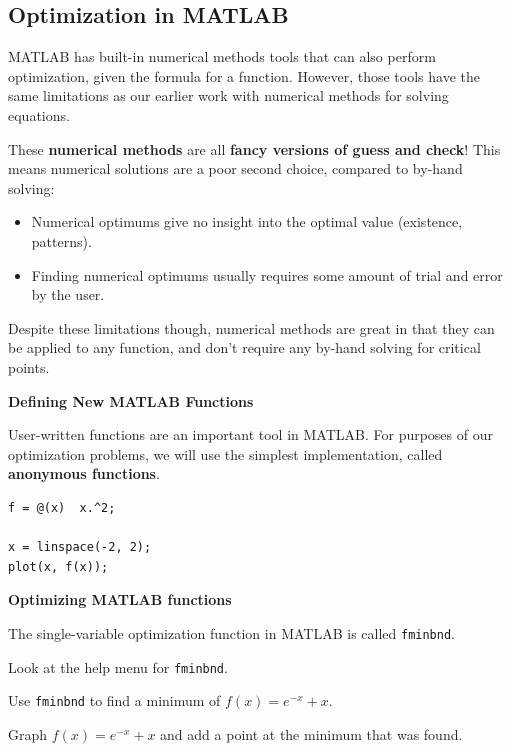 \newpage

\subsection*{Optimization in MATLAB}

MATLAB has built-in numerical methods tools that can also perform
optimization, given the formula for a function.  However, those tools
have the same limitations as our earlier work with numerical methods
for solving equations.

These {\bf numerical methods} are all {\bf fancy versions of guess and
  check}!  This means numerical solutions are a poor second choice,
compared to by-hand solving:
\begin{itemize}
\item Numerical optimums give no insight into the optimal value
  (existence, patterns).
\item Finding numerical optimums usually requires some amount of trial
  and error by the user.
\end{itemize}

Despite these limitations though, numerical methods are great in that
they can be applied to any function, and don't require any by-hand
solving for critical points.

\newpage

{\bf Defining New MATLAB Functions}

User-written functions are an important tool in MATLAB.  For purposes
of our optimization problems, we will use the simplest implementation,
called {\bf anonymous functions}.

\begin{verbatim}
f = @(x)  x.^2;

x = linspace(-2, 2);
plot(x, f(x)); 
\end{verbatim}

\newpage

{\bf Optimizing MATLAB functions} 

The single-variable optimization function in MATLAB is called \texttt{fminbnd}.

\problem Look at the help menu for \texttt{fminbnd}. 
\vfill


\newpage

\problem Use \texttt{fminbnd} to find a minimum of
$f(x) = e^{-x} + x$.

\vfill

Graph $f(x) = e^{-x} + x$ and add a point at the minimum that was
found.
\vfill

